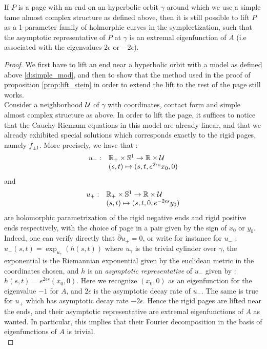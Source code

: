 \documentclass[../main.tex]{subfiles}
\begin{document}
\begin{proposition}\label{prop:rigid_pages_eigenfunc}
If $P$ is a page with an end on an hyperbolic orbit $\gamma$ around which we use a simple tame almost complex structure as defined above, then it is still possible to lift $P$ as a 1-parameter family of holmorphic curves in the symplectization, such that the asymptotic representative of $P$ at $\gamma$ is an extremal eigenfunction of $A$ (i.e associated with the eigenvalues $2\epsilon$ or $-2\epsilon$).
\end{proposition}

\begin{proof}
We first have to lift an end near a hyperbolic orbit with a model as defined above \ref{d:simple_mod}, and then to show that the method used in the proof of proposition \ref{prop:lift_stein} in order to extend the lift to the rest of the page still works.\\

Consider a neighborhood $\U$ of $\gamma$ with coordinates, contact form and simple almost complex structure as above. In order to lift the page, it suffices to notice that the Cauchy-Riemann equations in this model are already linear, and that we already exhibited special solutions which corresponds exactly to the rigid pages, namely $f_{\pm 1}$. More precisely, we have that : 
$$
\begin{array}{ll}
u_- : &\R_+ \times \Sp^1\rightarrow \R\times \U\\
&(s,t)\mapsto (s,t,e^{2\epsilon s}x_0,0)

\end{array}
$$
and 
$$
\begin{array}{ll}
u_+: &\R_+ \times \Sp^1\rightarrow \R\times \U\\
&(s,t)\mapsto (s,t,0,e^{-2\epsilon s}y_0)
\end{array}
$$
are holomorphic parametrization of the rigid negative ends and rigid positive ends respectively, with the choice of page in a pair given by the sign of $x_0$ or $y_0$. Indeed, one can verify directly that $\overline{\partial}u_\pm = 0$, or write for instance for $u_-$ : $u_-(s,t) = \exp_{u_\gamma}(h(s,t))$ where $u_\gamma$ is the trivial cylinder over $\gamma$, the exponential is the Riemannian exponential given by the euclidean metric in the coordinates chosen, and $h$ is an \textit{asymptotic representative} of $u_-$ given by : $h(s,t) = e^{2\epsilon s}(x_0,0)$. Here we recognize $(x_0,0)$ as an eigenfunction for the eigenvalue $-1$ for $A$, and $2\epsilon$ is the asymptotic decay rate of $u_-$. The same is true for $u_+$ which has asymptotic decay rate $-2\epsilon$. Hence the rigid pages are lifted near the ends, and their asymptotic representative are extremal eigenfunctions of $A$ as wanted. In particular, this implies that their Fourier decomposition in the basis of eigenfunctions of $A$ is trivial. \\


\end{proof}
\end{document}
